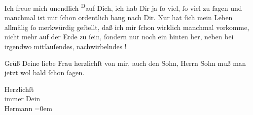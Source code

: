 \pstart
           {\pb}Ich freue mich unendlich \substVorne{}\textsuperscript{D}\substDazwischen{}a\substHinten{}uf Dich, ich hab Dir ja{ }ſo viel,{ }ſo viel zu{ }ſagen und manchmal ist mir{ }ſchon
               ordentlich bang nach Dir. Nur hat{ }ſich mein Leben allmälig{ }ſo merkwürdig geſtellt,
               daß ich mir{ }ſchon wirklich  manchmal vorkomme,
               nicht mehr auf der Erde zu{ }ſein,{ }ſondern nur noch ein hinten her, neben bei irgendwo
               mitſauſendes, nachwirbelndes \label{K_L01824-3v}\label{K_L01824-3}!\pend
           
\pstart
           Grüß Deine liebe Frau
               herzlichſt von mir, auch den Sohn, Herrn Sohn muß man jetzt wol bald{ }ſchon{ }ſagen.\pend
           
\pstart
           Herzlichſt{\\[\baselineskip]}immer Dein{\\[\baselineskip]}\spacefill\mbox{Hermann}\pend
           \leftskip=0em{}\endnumbering{}  \newcommand{\dateiname}{L01824}\newcommand{\titel}{Hermann Bahr an Arthur Schnitzler, 18. 1. 1909}\newcommand{\editorInnen}{Herausgegeben von Martin Anton Müller}
